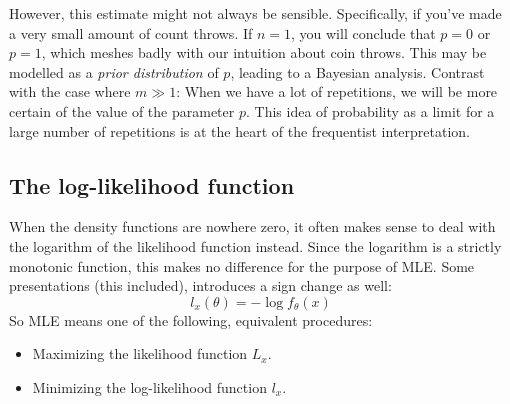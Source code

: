 \documentclass[12pt, a4paper]{article}
\numberwithin{equation}{section}
\begin{document}
However, this estimate might not always be sensible. Specifically, if you've made a very small amount of count throws. If $n=1$, you will conclude that $p=0$ or $p=1$, which meshes badly with our intuition about coin throws. This may be modelled as a \textit{prior distribution} of $p$, leading to a Bayesian analysis. Contrast with the case where $m\gg 1$: When we have a lot of repetitions, we will be more certain of the value of the parameter $p$. This idea of probability as a limit for a large number of repetitions is at the heart of the frequentist interpretation.

\subsection{The log-likelihood function}
When the density functions are nowhere zero, it often makes sense to deal with the logarithm of the likelihood function instead. Since the logarithm is a strictly monotonic function, this makes no difference for the purpose of MLE. Some presentations (this included), introduces a sign change as well:
\begin{equation}
l_x(\theta)=-\log f_\theta(x)
\end{equation}
So MLE means one of the following, equivalent procedures:
\begin{itemize}
\item Maximizing the likelihood function $L_x$.
\item Minimizing the log-likelihood function $l_x$.
\end{itemize}
\end{document}
